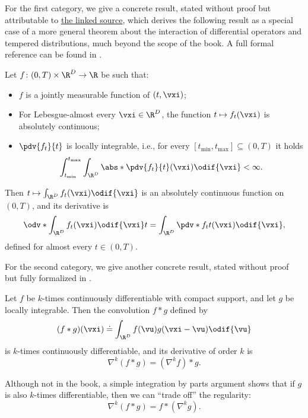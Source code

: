 \documentclass[../../book-main.tex]{subfiles}
\begin{document}
For the first category, we give a concrete result, stated without
proof but attributable to
\href{https://planetmath.org/differentiationundertheintegralsign}{the
linked source}, which derives the following result as a special case
of a more general theorem about the interaction of differential
operators and tempered distributions, much beyond the scope of the
book. A full formal reference can be found in \cite{jones1982theory}.
\begin{proposition}\label{prop:dutis}
    Let \(f \colon (0, T) \times \R^{D} \to \R\) be such that:
    \begin{itemize}
        \item \(f\) is a jointly measurable function of \((t, \vxi)\);
        \item For Lebesgue-almost every \(\vxi \in \R^{D}\), the
            function \(t \mapsto f_{t}(\vxi)\) is absolutely continuous;
        \item \(\pdv{f_{t}}{t}\) is locally integrable, i.e., for
            every \([t_{\min}, t_{\max}] \subseteq (0, T)\) it holds
            \begin{equation}
                \int_{t_{\min}}^{t_{\max}}\int_{\R^{D}}\abs*{\pdv{f_{t}}{t}(\vxi)}\odif{\vxi}
                < \infty.
            \end{equation}
    \end{itemize}
    Then \(t \mapsto \int_{\R^{D}}f_{t}(\vxi)\odif{\vxi}\) is an
    absolutely continuous function on \((0, T)\), and its derivative is
    \begin{equation}
        \odv*{\int_{\R^{D}}f_{t}(\vxi)\odif{\vxi}}{t} =
        \int_{\R^{D}}\pdv*{f_{t}}{t}(\vxi)\odif{\vxi},
    \end{equation}
    defined for almost every \(t \in (0, T)\).
\end{proposition}

For the second category, we give another concrete result, stated
without proof but fully formalized in \cite{brezis2011functional}.
\begin{proposition}\label{prop:diff_convolution}
    Let \(f\) be \(k\)-times continuously differentiable with compact
    support, and let \(g\) be locally integrable. Then the
    convolution \(f * g\) defined by
    \begin{equation}
        (f * g)(\vxi) \doteq \int_{\R^{D}}f(\vu)g(\vxi - \vu)\odif{\vu}
    \end{equation}
    is \(k\)-times continuously differentiable, and its derivative of
    order \(k\) is
    \begin{equation}
        \nabla^{k}(f * g) =(\nabla^{k}f) * g.
    \end{equation}
\end{proposition}
Although not in the book, a simple integration by parts argument
shows that if \(g\) is also \(k\)-times differentiable, then we can
``trade off'' the regularity:
\begin{equation}
    \nabla^{k}(f * g) = f * (\nabla^{k} g).
\end{equation}
\end{document}
